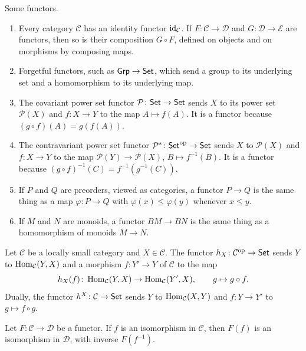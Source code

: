 \begin{example}\label{categories:example-functors}
Some functors.
\begin{enumerate}
\item Every category $\mathcal{C}$ has an identity functor
$\mathrm{id}_{\mathcal{C}}$. If $F \colon \mathcal{C} \to \mathcal{D}$ and
$G \colon \mathcal{D} \to \mathcal{E}$ are functors, then so is their
composition $G \circ F$, defined on objects and on morphisms by composing
maps.
\item Forgetful functors, such as $\mathsf{Grp} \to \mathsf{Set}$, which send a group to
its underlying set and a homomorphism to its underlying map.
\item The covariant power set functor $\mathcal{P} \colon \mathsf{Set} \to \mathsf{Set}$
sends $X$ to its power set $\mathcal{P}(X)$ and $f \colon X \to Y$ to the map
$A \mapsto f(A)$. It is a functor because $(g \circ f)(A) = g(f(A))$.
\item The contravariant power set functor
$\mathcal{P}^* \colon \mathsf{Set}^{\mathrm{op}} \to \mathsf{Set}$ sends $X$ to $\mathcal{P}(X)$ and
$f \colon X \to Y$ to the map $\mathcal{P}(Y) \to \mathcal{P}(X)$,
$B \mapsto f^{-1}(B)$. It is a functor because
$(g \circ f)^{-1}(C) = f^{-1}(g^{-1}(C))$.
\item If $P$ and $Q$ are preorders, viewed as categories, a functor
$P \to Q$ is the same thing as a map $\varphi \colon P \to Q$ with
$\varphi(x) \leq \varphi(y)$ whenever $x \leq y$.
\item If $M$ and $N$ are monoids, a functor $BM \to BN$ is the same thing as a
homomorphism of monoids $M \to N$.
\end{enumerate}
\end{example}

\begin{definition}\label{categories:definition-hom-functors}
Let $\mathcal{C}$ be a locally small category and $X \in \mathcal{C}$. The
functor $h_X \colon \mathcal{C}^{\mathrm{op}} \to \mathsf{Set}$ sends $Y$ to
$\operatorname{Hom}_{\mathcal{C}}(Y, X)$ and a morphism $f \colon Y' \to Y$ of $\mathcal{C}$
to the map
\[
h_X(f) \colon \operatorname{Hom}_{\mathcal{C}}(Y, X) \to \operatorname{Hom}_{\mathcal{C}}(Y', X),
\qquad g \mapsto g \circ f.
\]
Dually, the functor $h^X \colon \mathcal{C} \to \mathsf{Set}$ sends $Y$ to
$\operatorname{Hom}_{\mathcal{C}}(X, Y)$ and $f \colon Y \to Y'$ to $g \mapsto f \circ g$.
\end{definition}

\begin{lemma}\label{categories:lemma-functors-preserve-isomorphisms}
Let $F \colon \mathcal{C} \to \mathcal{D}$ be a functor. If $f$ is an
isomorphism in $\mathcal{C}$, then $F(f)$ is an isomorphism in $\mathcal{D}$,
with inverse $F(f^{-1})$.
\end{lemma}


